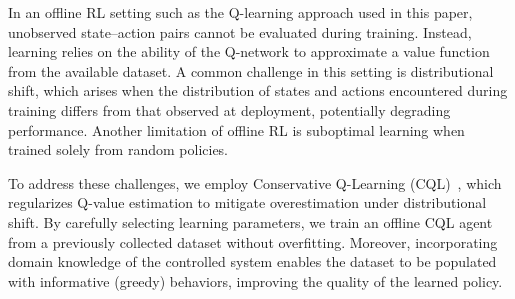 
In an offline RL setting such as the Q-learning approach used in this paper, unobserved state–action pairs cannot be evaluated during training. Instead, learning relies on the ability of the Q-network to approximate a value function from the available dataset. A common challenge in this setting is distributional shift, which arises when the distribution of states and actions encountered during training differs from that observed at deployment, potentially degrading performance. Another limitation of offline RL is suboptimal learning when trained solely from random policies.

To address these challenges, we employ Conservative Q-Learning (CQL)~\cite{levine2020offline}, which regularizes Q-value estimation to mitigate overestimation under distributional shift. By carefully selecting learning parameters, we train an offline CQL agent from a previously collected dataset without overfitting. Moreover, incorporating domain knowledge of the controlled system enables the dataset to be populated with informative (greedy) behaviors, improving the quality of the learned policy. 

